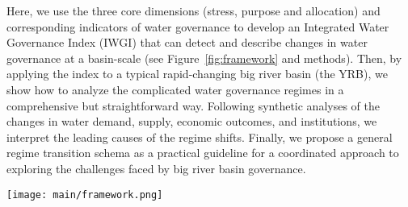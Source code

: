 Here, we use the three core dimensions (stress, purpose and allocation) and corresponding indicators of water governance to develop an Integrated Water Governance Index (IWGI) that can detect and describe changes in water governance at a basin-scale (see Figure~\ref{fig:framework} and methods).
Then, by applying the index to a typical rapid-changing big river basin (the YRB), we show how to analyze the complicated water governance regimes in a comprehensive but straightforward way.
Following synthetic analyses of the changes in water demand, supply, economic outcomes, and institutions, we interpret the leading causes of the regime shifts.
Finally, we propose a general regime transition schema as a practical guideline for a coordinated approach to exploring the challenges faced by big river basin governance.

\begin{figure*}[!ht]
	\centering
	\texttt{[image: main/framework.png]}
	\caption{
		Identifying the water governance regimes in transitions of a hydrosocial cycle.
		\textbf{A.} Water governance has three key dimensions (stress, purpose and allocation), each of which has two potential directions (denoted in red) when changing. (1) ``stress'' of water shifts between scarcity and abundance; (2) weighting ``purpose'' of water between consumptive services or non-consumptive uses; (3) ``allocation'' changes between balanced or lopsided.
		\textbf{B.} Along with a transition in hydrosocial water cycle, water governance shifts in line with the three dimensions. Combining corresponding indicators, an abrupt change of the IWGI thus indicates a regime shift in water governance.
	}
	\label{fig:framework}
\end{figure*}
